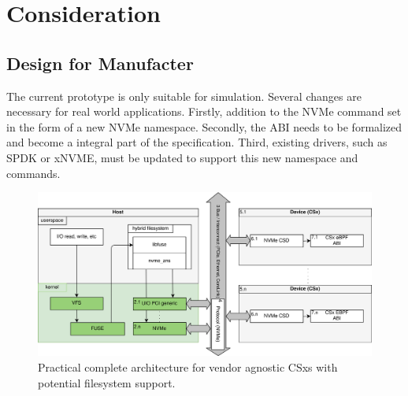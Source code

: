 
\chapter{Consideration} %



\ifpdf
    \graphicspath{{7/figures/PNG/}{7/figures/PDF/}{7/figures/}}
\else
    \graphicspath{{7/figures/EPS/}{7/figures/}}
\fi


\section{Design for Manufacter}

The current prototype is only suitable for simulation. Several changes are
necessary for real world applications. Firstly, addition to the NVMe command set
in the form of a new NVMe namespace. Secondly, the ABI needs to be formalized
and become a integral part of the specification. Third, existing drivers, such
as SPDK or xNVME, must be updated to support this new namespace and commands.


\begin{figure}
    \centering
	\includegraphics[width=1\textwidth]{resources/images/loader-pfs-arch-v3.png}
	\caption{Practical complete architecture for vendor agnostic CSxs with
        potential filesystem support.}
    \label{figure:practicalarchitecture}
\end{figure}

